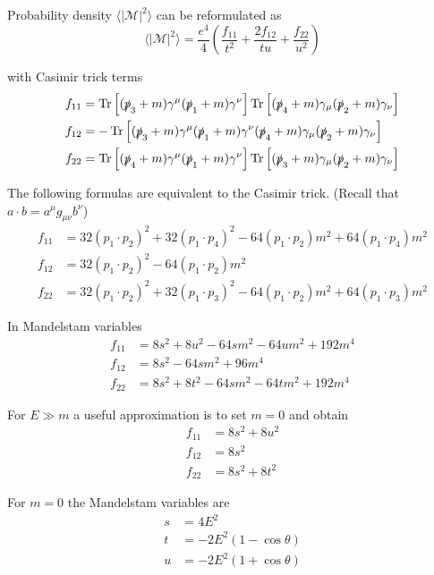 Probability density $\langle|\mathcal{M}|^2\rangle$ can be reformulated as
\begin{equation*}
\langle|\mathcal{M}|^2\rangle
=\frac{e^4}{4}
\left(
\frac{f_{11}}{t^2}+\frac{2f_{12}}{tu}+\frac{f_{22}}{u^2}
\right)
\end{equation*}

with Casimir trick terms
\begin{align*}
f_{11}&=
\operatorname{Tr}\left[
(\slashed p_3+m)\gamma^\mu(\slashed p_1+m)\gamma^\nu
\right]
\operatorname{Tr}\left[
(\slashed p_4+m)\gamma_\mu(\slashed p_2+m)\gamma_\nu
\right]
\\
f_{12}&=
-\operatorname{Tr}\left[
(\slashed p_3+m)\gamma^\mu(\slashed p_1+m)\gamma^\nu
(\slashed p_4+m)\gamma_\mu(\slashed p_2+m)\gamma_\nu
\right]
\\
f_{22}&=
\operatorname{Tr}\left[
(\slashed p_4+m)\gamma^\mu(\slashed p_1+m)\gamma^\nu
\right]
\operatorname{Tr}\left[
(\slashed p_3+m)\gamma_\mu(\slashed p_2+m)\gamma_\nu
\right]
\end{align*}

The following formulas are equivalent to the Casimir trick.
(Recall that $a\cdot b=a^\mu g_{\mu\nu}b^\nu$)
\begin{align*}
f_{11}&=32 (p_1\cdot p_2)^2 + 32 (p_1\cdot p_4)^2 - 64 (p_1\cdot p_2) m^2 + 64 (p_1\cdot p_4) m^2
\\
f_{12}&=32 (p_1\cdot p_2)^2 - 64 (p_1\cdot p_2) m^2
\\
f_{22}&=32 (p_1\cdot p_2)^2 + 32 (p_1\cdot p_3)^2 - 64 (p_1\cdot p_2) m^2 + 64 (p_1\cdot p_3) m^2
\end{align*}

In Mandelstam variables
\begin{align*}
f_{11} &= 8 s^2 + 8 u^2 - 64 s m^2 - 64 u m^2 + 192 m^4
\\
f_{12} &= 8 s^2 - 64 s m^2 + 96 m^4
\\
f_{22} &= 8 s^2 + 8 t^2 - 64 s m^2 - 64 t m^2 + 192 m^4
\end{align*}

For $E\gg m$ a useful approximation is to set $m=0$ and obtain
\begin{align*}
f_{11}&=8s^2+8u^2\\
f_{12}&=8s^2\\
f_{22}&=8s^2+8t^2
\end{align*}

For $m=0$ the Mandelstam variables are
\begin{align*}
s&=4E^2
\\
t&=-2E^2(1-\cos\theta)
\\
u&=-2E^2(1+\cos\theta)
\end{align*}

